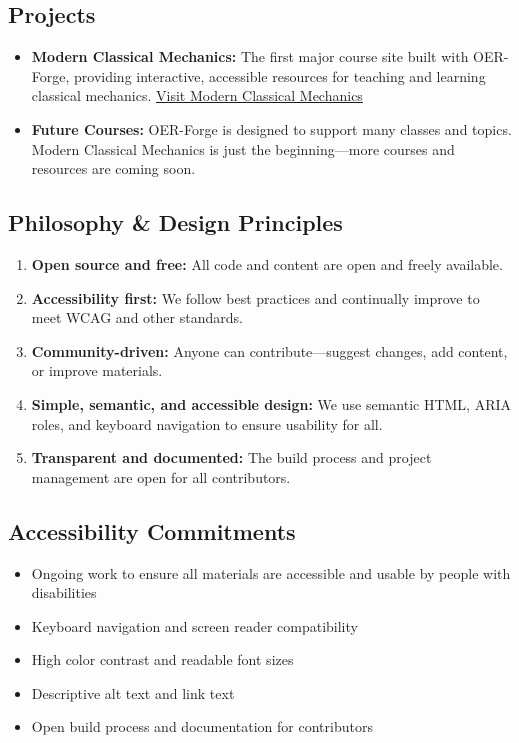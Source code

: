 \subsection{Projects}\label{projects}

\begin{itemize}
\tightlist
\item
  \textbf{Modern Classical Mechanics:} The first major course site built
  with OER-Forge, providing interactive, accessible resources for
  teaching and learning classical mechanics.
  \href{https://dannycaballero.info/modern-classical-mechanics/}{Visit
  Modern Classical Mechanics}
\item
  \textbf{Future Courses:} OER-Forge is designed to support many classes
  and topics. Modern Classical Mechanics is just the beginning---more
  courses and resources are coming soon.
\end{itemize}

\subsection{Philosophy \& Design
Principles}\label{philosophy-design-principles}

\begin{enumerate}
\def\labelenumi{\arabic{enumi}.}
\tightlist
\item
  \textbf{Open source and free:} All code and content are open and
  freely available.
\item
  \textbf{Accessibility first:} We follow best practices and continually
  improve to meet WCAG and other standards.
\item
  \textbf{Community-driven:} Anyone can contribute---suggest changes,
  add content, or improve materials.
\item
  \textbf{Simple, semantic, and accessible design:} We use semantic
  HTML, ARIA roles, and keyboard navigation to ensure usability for all.
\item
  \textbf{Transparent and documented:} The build process and project
  management are open for all contributors.
\end{enumerate}

\subsection{Accessibility Commitments}\label{accessibility-commitments}

\begin{itemize}
\tightlist
\item
  Ongoing work to ensure all materials are accessible and usable by
  people with disabilities
\item
  Keyboard navigation and screen reader compatibility
\item
  High color contrast and readable font sizes
\item
  Descriptive alt text and link text
\item
  Open build process and documentation for contributors
\end{itemize}

